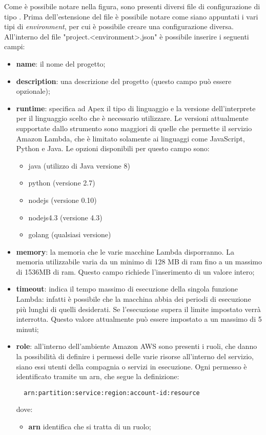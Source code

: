 Come è possibile notare nella figura, sono presenti diversi file di
configurazione di tipo . Prima
dell'estensione del file è possibile notare come siano appuntati i vari tipi di
\textit{environment}, per cui è possibile creare una configurazione diversa.
All'interno del file "project.<environment>.json" è possibile inserire i
seguenti campi:
\begin{itemize}
  \item \textbf{name}: il nome del progetto;
  \item \textbf{description}: una descrizione del progetto (questo campo può
essere opzionale);
  \item \textbf{runtime}: specifica ad Apex il tipo di linguaggio e la versione
dell'interprete per il linguaggio scelto che è necessario utilizzare. Le
versioni attualmente supportate dallo strumento sono maggiori di quelle che
permette il servizio Amazon Lambda, che è limitato solamente ai linguaggi come
JavaScript, Python e Java. Le opzioni disponibili per questo campo sono:
  \begin{itemize}
    \item java (utilizzo di Java versione 8)
    \item python (versione 2.7)
    \item nodejs (versione 0.10)
    \item nodejs4.3 (versione 4.3)
    \item golang (qualsiasi versione)
  \end{itemize}

  \item \textbf{memory}: la memoria che le varie macchine Lambda disporranno.
La memoria utilizzabile varia da un minimo di 128 MB di \gls{ram} fino a un
massimo di 1536MB di \gls{ram}. Questo campo richiede l'inserimento di un
valore intero;

  \item \textbf{timeout}: indica il tempo massimo di esecuzione della singola
funzione Lambda: infatti è possibile che la macchina abbia dei periodi di
esecuzione più lunghi di quelli desiderati. Se l'esecuzione supera il limite
impostato verrà interrotta. Questo valore attualmente può essere impostato a un
massimo di 5 minuti;

  \item \textbf{role}: all'interno dell'ambiente Amazon AWS sono presenti i
ruoli, che danno la possibilità di definire i permessi delle varie risorse
all'interno del servizio, siano essi utenti della compagnia o servizi in
esecuzione. Ogni permesso è identificato tramite un \gls{arn}, che segue la
definizione:
\begin{verbatim}
  arn:partition:service:region:account-id:resource
\end{verbatim}
dove:
  \begin{itemize}
    \item \textbf{arn} identifica che si tratta di un ruolo;


\end{itemize}
\end{itemize}
